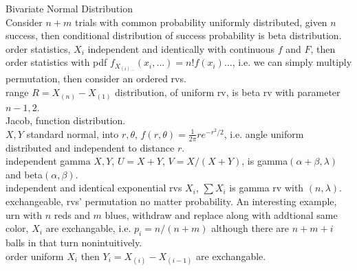 \documentclass[paper=a4, fontsize=11pt]{scrartcl} %
\numberwithin{equation}{section} %
\numberwithin{figure}{section} %
\numberwithin{table}{section} %
\begin{document}
Bivariate Normal Distribution\\
Consider $n+m$ trials with common probability uniformly distributed, given $n$ success, then conditional distribution of success probability is beta distribution.\\
order statistics, $X_i$ independent and identically with continuous $f$ and $F$, then order statistics with pdf $f_{X_{(i)...}} (x_i,...) = n! f(x_i)\dots$, i.e. we can simply multiply permutation, then consider an ordered rvs.\\
range $R=X_{(n)} - X_{(1)}$ distribution, of uniform rv, is beta rv with parameter $n-1,2$.\\
Jacob, function distribution.\\
$X,Y$ standard normal, into $r,\theta$, $f(r,\theta)=\frac{1}{2\pi} re^{-r^2/2}$, i.e. angle uniform distributed and independent to distance $r$.\\
independent gamma $X,Y$, $U=X+Y$, $V=X/(X+Y)$, is gamma$(\alpha+\beta,\lambda)$ and beta$(\alpha,\beta)$.\\
independent and identical exponential rvs $X_i$, $\sum X_i$ is gamma rv with $(n,\lambda)$.\\
exchangeable, rvs' permutation no matter probability. An interesting example, urn with $n$ reds and $m$ blues, withdraw and replace along with addtional same color, $X_i$ are exchangable, i.e. $p_i= n/(n+m)$ although there are $n+m+i$ balls in that turn nonintuitively.\\
order uniform $X_i$ then $Y_i=X_{(i)} - X_{(i-1)}$ are exchangable.
\end{document}
